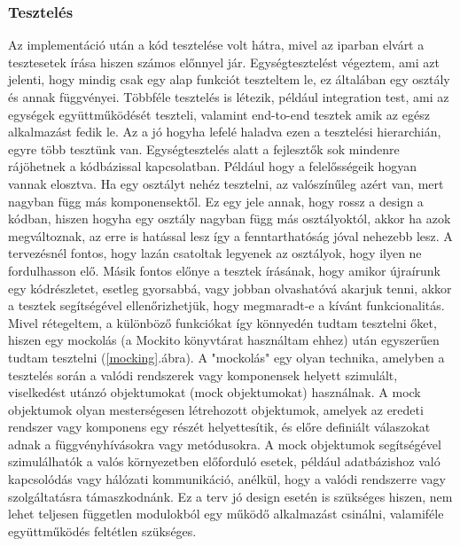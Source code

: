 \documentclass[a4paper,twoside]{article}
\begin{document}
\subsubsection{Tesztelés}
Az implementáció után a kód tesztelése volt hátra, mivel az iparban elvárt a tesztesetek írása hiszen számos előnnyel jár.
Egységtesztelést végeztem, ami azt jelenti, hogy mindig csak egy alap funkciót teszteltem le, ez általában egy osztály és annak függvényei. Többféle tesztelés is létezik, például integration test, ami az egységek együttműködését teszteli, valamint end-to-end tesztek amik az egész alkalmazást fedik le. Az a jó hogyha lefelé haladva ezen a tesztelési hierarchián, egyre több tesztünk van. Egységtesztelés 
alatt a fejlesztők sok mindenre rájöhetnek a kódbázissal kapcsolatban. Például hogy a felelősségeik hogyan vannak elosztva. Ha egy osztályt nehéz tesztelni, az valószínűleg azért van, mert nagyban függ más komponensektől. Ez egy jele annak, hogy rossz a design a kódban, hiszen hogyha egy osztály nagyban függ más osztályoktól, akkor ha azok megváltoznak, az erre is hatással lesz így a fenntarthatóság jóval nehezebb lesz. A tervezésnél fontos, hogy lazán csatoltak legyenek az osztályok, hogy ilyen ne fordulhasson elő. Másik fontos előnye a tesztek írásának, hogy amikor újraírunk egy kódrészletet, esetleg gyorsabbá, vagy jobban olvashatóvá akarjuk tenni, akkor a tesztek segítségével ellenőrizhetjük, hogy megmaradt-e a kívánt funkcionalitás.  Mivel rétegeltem, a különböző funkciókat így könnyedén tudtam tesztelni őket, hiszen
egy mockolás (a Mockito \cite{mockito} könyvtárat használtam ehhez) után egyszerűen tudtam tesztelni (\ref{mocking}.ábra).
A "mockolás" egy olyan technika, amelyben a tesztelés során a valódi rendszerek vagy
komponensek helyett szimulált, viselkedést utánzó objektumokat (mock objektumokat) használnak.
A mock objektumok olyan mesterségesen létrehozott objektumok, amelyek az
eredeti rendszer vagy komponens egy részét helyettesítik, és előre definiált válaszokat adnak a
függvényhívásokra vagy metódusokra. A mock objektumok segítségével szimulálhatók a
valós környezetben előforduló esetek, például adatbázishoz való kapcsolódás vagy hálózati
kommunikáció, anélkül, hogy a valódi rendszerre vagy szolgáltatásra támaszkodnánk. Ez a terv jó design esetén is szükséges hiszen, nem lehet teljesen független modulokból egy működő alkalmazást csinálni, valamiféle együttműködés feltétlen szükséges. 
\end{document}
